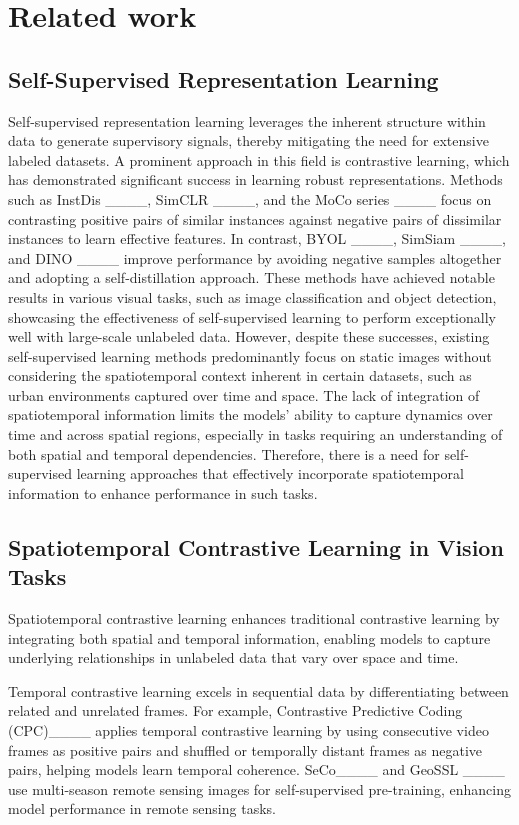 \section{Related work}
\subsection{Self-Supervised Representation Learning}
Self-supervised representation learning leverages the inherent structure within data to generate supervisory signals, thereby mitigating the need for extensive labeled datasets. A prominent approach in this field is contrastive learning, which has demonstrated significant success in learning robust representations. Methods such as InstDis ____, SimCLR ____, and the MoCo series ____ focus on contrasting positive pairs of similar instances against negative pairs of dissimilar instances to learn effective features. In contrast, BYOL ____, SimSiam ____, and DINO ____ improve performance by avoiding negative samples altogether and adopting a self-distillation approach. These methods have achieved notable results in various visual tasks, such as image classification and object detection, showcasing the effectiveness of self-supervised learning to perform exceptionally well with large-scale unlabeled data. However, despite these successes, existing self-supervised learning methods predominantly focus on static images without considering the spatiotemporal context inherent in certain datasets, such as urban environments captured over time and space. The lack of integration of spatiotemporal information limits the models' ability to capture dynamics over time and across spatial regions, especially in tasks requiring an understanding of both spatial and temporal dependencies. Therefore, there is a need for self-supervised learning approaches that effectively incorporate spatiotemporal information to enhance performance in such tasks.

\subsection{Spatiotemporal Contrastive Learning in Vision Tasks}
Spatiotemporal contrastive learning enhances traditional contrastive learning by integrating both spatial and temporal information, enabling models to capture underlying relationships in unlabeled data that vary over space and time.

Temporal contrastive learning excels in sequential data by differentiating between related and unrelated frames. For example, Contrastive Predictive Coding (CPC)____ applies temporal contrastive learning by using consecutive video frames as positive pairs and shuffled or temporally distant frames as negative pairs, helping models learn temporal coherence. 
SeCo____ and GeoSSL ____ use multi-season remote sensing images for self-supervised pre-training, enhancing model performance in remote sensing tasks.


